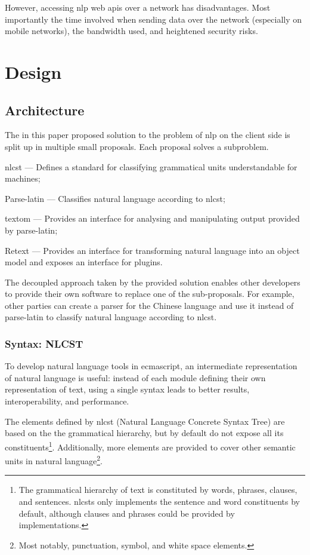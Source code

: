 \begin{enumerate}
However, accessing \gls{nlp} web \glspl{api} over a network has
disadvantages. Most importantly the time involved when sending data over
the network (especially on mobile networks), the bandwidth used, and
heightened security risks.

\chapter{Design}\label{design}

\section{Architecture}\label{architecture}

The in this paper proposed solution to the problem of \gls{nlp} on the
client side is split up in multiple small proposals. Each proposal
solves a subproblem.

\begin{aenumerate}
\item
  \gls{nlcst} --- Defines a standard for classifying grammatical units
  understandable for machines;
\item
  Parse-latin --- Classifies natural language according to \gls{nlcst};
\item
  \gls{textom} --- Provides an interface for analysing and manipulating
  output provided by parse-latin;
\item
  Retext --- Provides an interface for transforming natural language
  into an object model and exposes an interface for plugins.
\end{aenumerate}

The decoupled approach taken by the provided solution enables other
developers to provide their own software to replace one of the
sub-proposals. For example, other parties can create a parser for the
Chinese language and use it instead of parse-latin to classify natural
language according to \gls{nlcst}.

\subsection{Syntax: NLCST}\label{syntax}

To develop natural language tools in \gls{ecmascript}, an intermediate
representation of natural language is useful: instead of each module
defining their own representation of text, using a single syntax leads
to better results, interoperability, and performance.

The elements defined by \gls{nlcst} (Natural Language Concrete Syntax
Tree) are based on the the grammatical hierarchy, but by default do not
expose all its constituents\footnote{The grammatical hierarchy of text
  is constituted by words, phrases, clauses, and sentences.
  \glspl{nlcst} only implements the sentence and word constituents by
  default, although clauses and phrases could be provided by
  implementations.}. Additionally, more elements are provided to cover
other semantic units in natural language\footnote{Most notably,
  punctuation, symbol, and white space elements.}.


\end{enumerate}
